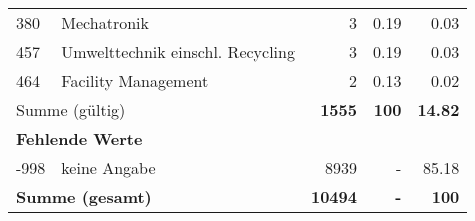 \begin{longtable}{lXrrr}
        380 & \multicolumn{1}{X}{Mechatronik} & %
          \num{3} &
          \num[round-mode=places,round-precision=2]{0.19} &
          \num[round-mode=places,round-precision=2]{0.03} \\

        457 & \multicolumn{1}{X}{Umwelttechnik einschl. Recycling} & %
          \num{3} &
          \num[round-mode=places,round-precision=2]{0.19} &
          \num[round-mode=places,round-precision=2]{0.03} \\

        464 & \multicolumn{1}{X}{Facility Management} & %
          \num{2} &
          \num[round-mode=places,round-precision=2]{0.13} &
          \num[round-mode=places,round-precision=2]{0.02} \\

     \midrule
     \multicolumn{2}{l}{Summe (gültig)} &
       \textbf{\num{1555}} &
     \textbf{\num{100}} &
       \textbf{\num[round-mode=places,round-precision=2]{14.82}} \\
     \multicolumn{5}{l}{\textbf{Fehlende Werte}}\\
       -998 &
       keine Angabe &
         \num{8939} &
        - &
         \num[round-mode=places,round-precision=2]{85.18} \\
     \midrule
     \multicolumn{2}{l}{\textbf{Summe (gesamt)}} &
          \textbf{\num{10494}} &
        \textbf{-} &
        \textbf{\num{100}} \\
     \bottomrule
     \end{longtable}
     
